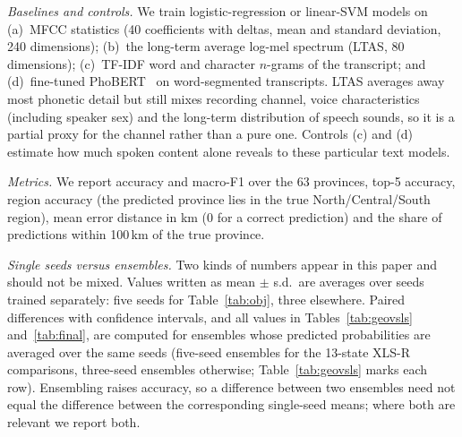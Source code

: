 \documentclass[conference]{IEEEtran}
\begin{document}
\textit{Baselines and controls.} We train logistic-regression or linear-SVM models on (a)~MFCC statistics (40 coefficients with deltas, mean and standard deviation, 240 dimensions); (b)~the long-term average log-mel spectrum (LTAS, 80 dimensions); (c)~TF-IDF word and character $n$-grams of the transcript; and (d)~fine-tuned PhoBERT~\cite{phobert} on word-segmented transcripts. LTAS averages away most phonetic detail but still mixes recording channel, voice characteristics (including speaker sex) and the long-term distribution of speech sounds, so it is a partial proxy for the channel rather than a pure one. Controls (c) and (d) estimate how much spoken content alone reveals to these particular text models.

\textit{Metrics.} We report accuracy and macro-F1 over the 63 provinces, top-5 accuracy, region accuracy (the predicted province lies in the true North/Central/South region), mean error distance in km (0 for a correct prediction) and the share of predictions within 100\,km of the true province.

\textit{Single seeds versus ensembles.} Two kinds of numbers appear in this paper and should not be mixed. Values written as mean $\pm$ s.d.\ are averages over seeds trained separately: five seeds for Table~\ref{tab:obj}, three elsewhere. Paired differences with confidence intervals, and all values in Tables~\ref{tab:geovsls} and~\ref{tab:final}, are computed for ensembles whose predicted probabilities are averaged over the same seeds (five-seed ensembles for the 13-state XLS-R comparisons, three-seed ensembles otherwise; Table~\ref{tab:geovsls} marks each row). Ensembling raises accuracy, so a difference between two ensembles need not equal the difference between the corresponding single-seed means; where both are relevant we report both.
\end{document}
